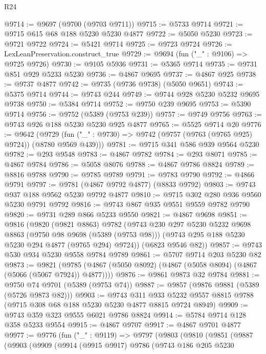 \begin{lexlean}{R24}
\begin{coremodule}
@9714 := @9697 (@9700 (@9703 @9711))
@9715 := @5733 @9714
@9721 := @9715 @615 @68 @188 @5230 @5230 @4877
@9722 := @5050 @5230
@9723 := @9721 @9722
@9724 := @5421 @9714
@9725 := @9723 @9724
@9726 := LexLeanPreservation.construct_true
@9729 := @9694 (fun ("_" : @9106) => @9725 @9726)
@9730 := @9105 @5936
@9731 := @5365 @9714
@9735 := @9731 @851 @929 @5233 @5230
@9736 := @4867 @9695
@9737 := @4867 @925
@9738 := @9737 @4877
@9742 := @9735 (@9736 @9738) (@5050 @9651)
@9743 := @5375 @9714
@9744 := @9743 @244
@9749 := @9744 @928 @5230 @5232 @9695 @9738
@9750 := @5384 @9714
@9752 := @9750 @239 @9695
@9753 := @5390 @9714
@9756 := @9752 (@5389 (@9753 @239))
@9757 := @9749 @9756
@9763 := @9743 @926 @188 @5230 @5230 @925 @4877
@9765 := @5525 @9714 @20
@9776 := @9642
    (@9729 (fun ("_" : @9730) => @9742 (@9757 (@9763 (@9765 @925) @9724)) (@8780 @9569 @439)))
@9781 := @9715 @341 @586 @939 @9564 @5230
@9782 := @293 @9548
@9783 := @4867 @9782
@9784 := @293 @8071
@9785 := @4867 @9784
@9786 := @5058 @8076
@9788 := @4867 @9786 @8824
@9789 := @8816 @9788
@9790 := @9785 @9789
@9791 := @9783 @9790
@9792 := @4866 @9791
@9797 := @9781 (@4867 @9792 @4877) (@8833 @9792)
@9803 := @9743 @937 @188 @9562 @5230 @9792 @4877
@9810 := @9715 @302 @280 @936 @9560 @5230 @9791 @9792
@9816 := @9743 @867 @935 @9551 @9559 @9782 @9790
@9820 := @9731 @289 @866 @5233 @9550
@9821 := @4867 @9698
@9851 := @9816
    (@9820
      (@9821 @8863)
      @9782
      (@9743
        @230
        @297
        @5230
        @5232
        @9698
        @8863
        (@9750 @98 @9698 (@5389 (@9753 @98)))
        (@9743 @295 @188 @5230 @5230 @294 @4877 (@9765 @294) @9724))
      (@6823 @9546 @82))
@9857 := @9743 @530 @934 @5230 @9558 @9784 @9789
@9861 := @5707 @9714 @203 @5230 @82
@9873 := @9821
    (@9785 (@4867 (@5050 @8092) (@4867 (@5058 @8094) (@4867 (@5066 (@5067 @7924)) @4877))))
@9876 := @9861 @9873 @32 @9784
@9881 := @9750 @74 @9701 (@5389 (@9753 @74))
@9887 := @9857 (@9876 @9881 (@5389 (@5726 @9873 @82)))
@9903 := @9743
    @311
    @933
    @5232
    @9557
    @8815
    @9788
    (@9715 @308 @68 @188 @5230 @5230 @4877 @8815 @9724 @8949)
@9909 := @9743 @359 @323 @9555 @6021 @9786 @8824
@9914 := @5784 @9714 @128 @358 @5233 @9554
@9915 := @4867 @9707
@9917 := @4867 @9701 @4877
@9977 := @9776
    (fun ("_" : @9119) =>
    @9797
      (@9803
        (@9810
          (@9851
            (@9887
              (@9903
                (@9909
                  (@9914
                    (@9915 @9917)
                    @9786
                    (@9743
                      @186
                      @205
                      @5230

\end{coremodule}
\end{lexlean}
